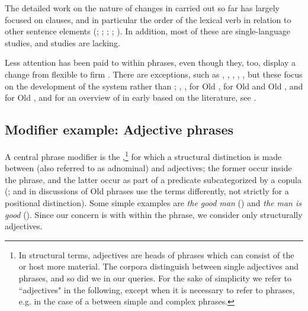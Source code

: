 \documentclass[output=paper,colorlinks,citecolor=brown,draft]{langscibook}
\begin{document}
The detailed work on the nature of  changes in  carried out so far has largely focused on clauses, and in particular the order of the lexical verb in relation to other sentence elements (\cite[see for instance articles in][]{HinterholzlPetrova09}; \cite{FerraresiLuhr04}; \cite{BatlloriLluisa11}; \cite{MeurmanSolinetal12}; \cite{BechEide14}). In addition, most of these are single-language studies, and  studies are lacking. 
	
 Less attention has been paid to  within  phrases, even though they, too, display a change from flexible to firm . There are exceptions, such as
\citet{Demske01}, \citet{Allen12}, \citet{Breban12}, \citet{Vartiainen12}, \citet{Borjarsetal16}, but these focus on the development of the  system rather than ; \citet{Fischer00,Fischer01,Fischer06,Fischer12}, \citet{Haumann03, Haumann10}, \citet{Bech19} for Old , \citet{Bech17} for Old  and Old , and  for Old , and for an overview of  in early  based on the literature, see \citet[§4.4]{ratkus2011}.

\subsection{Modifier example: Adjective phrases}\label{subsectmodex}

A central  phrase modifier is the ,\footnote{In structural terms, adjectives are heads of  phrases which can consist of the  or host more material. The corpora distinguish between single adjectives and  phrases, and so did we in our queries. For the sake of simplicity we refer to “adjectives" in the following, except when it is necessary to refer to  phrases, e.g. in the case of a  between simple and complex  phrases.} for which a structural distinction is made between  (also referred to as adnominal) and  adjectives; the former occur inside the  phrase, and the latter occur as part of a predicate subcategorized by a copula (\cite{Fischer00,Fischer01}; \cite{Pysz09} and \cite{Haumann10} in discussions of Old   phrases use the terms differently, not strictly for a positional distinction). Some simple examples are \textit{the good man} () and \textit{the man is good} (). Since our concern is with  within the  phrase, we consider only structurally  adjectives. 
	
\end{document}
